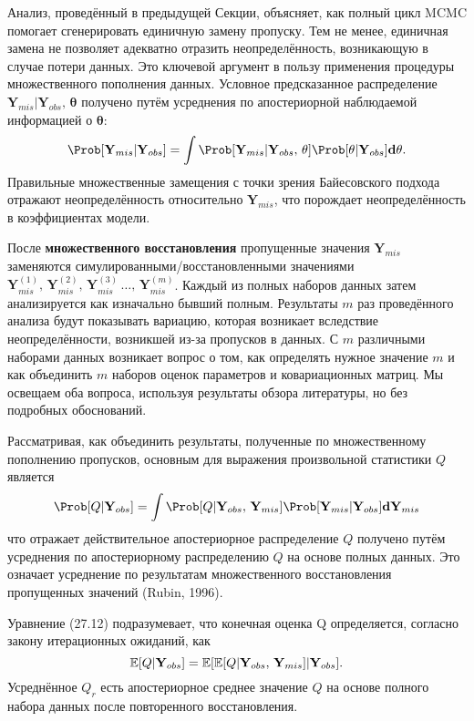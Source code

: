Анализ, проведённый в предыдущей Секции, объясняет, как полный цикл MCMC помогает сгенерировать единичную замену пропуску. Тем не менее, единичная замена не позволяет адекватно отразить неопределённость, возникающую в случае потери данных. Это ключевой аргумент в пользу применения процедуры множественного пополнения данных. Условное предсказанное распределение $\mathbf{Y}_{mis}|\mathbf{Y}_{obs}, \, \mathbf{\theta}$ получено путём усреднения по апостериорной наблюдаемой информацией о $\mathbf{\theta}$:
\[
\Prob[\mathbf{Y}_{mis}|\mathbf{Y}_{obs}] = \int \Prob[\mathbf{Y}_{mis}|\mathbf{Y}_{obs}, \, \mathbf{\theta}] \Prob[\mathbf{\theta}|\mathbf{Y}_{obs}]\mathbf{d\theta}.
\]
Правильные множественные замещения с точки зрения Байесовского подхода отражают неопределённость относительно $\mathbf{Y}_{mis}$, что порождает неопределённость в коэффициентах модели.

После {\bf множественного восстановления} пропущенные значения $\mathbf{Y}_{mis}$ заменяются симулированными/восстановленными значениями $\mathbf{Y}_{mis}^{(1)}, \, \mathbf{Y}_{mis}^{(2)}, \, \mathbf{Y}_{mis}^{(3)}\, \dots, \, \mathbf{Y}_{mis}^{(m)}$. Каждый из полных наборов данных затем анализируется как изначально бывший полным. Результаты $m$ раз проведённого анализа будут показывать вариацию, которая возникает вследствие неопределённости, возникшей из-за пропусков в данных. С $m$ различными наборами данных возникает вопрос о том, как определять нужное значение $m$ и как объединить $m$ наборов оценок параметров и ковариационных матриц. Мы освещаем оба вопроса, используя результаты обзора литературы, но без подробных обоснований.

Рассматривая, как объединить результаты, полученные по множественному пополнению пропусков, основным для выражения произвольной статистики $Q$ является
\begin{equation}
\Prob[Q|\mathbf{Y}_{obs}] = 
\int \Prob[Q|\mathbf{Y}_{obs}, \, \mathbf{Y}_{mis}] 
\Prob[\mathbf{Y}_{mis}|\mathbf{Y}_{obs}]\mathbf{d}\mathbf{Y}_{mis}
\end{equation}
что отражает действительное апостериорное распределение $Q$ получено путём усреднения по апостериорному распределению $Q$ на основе полных данных. Это означает усреднение  по результатам множественного восстановления пропущенных значений (Rubin, 1996).

Уравнение (27.12) подразумевает, что конечная оценка Q определяется, согласно закону итерационных ожиданий, как
\begin{equation}
\mathbb{E}[Q|\mathbf{Y}_{obs}]=\mathbb{E}[\mathbb{E}[Q|\mathbf{Y}_{obs}, \, \mathbf{Y}_{mis}]|\mathbf{Y}_{obs}].
\end{equation}
Усреднённое $Q_r$ есть апостериорное среднее значение $Q$ на основе полного набора данных после повторенного восстановления.

